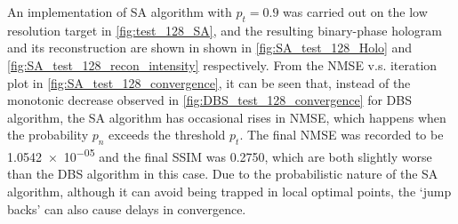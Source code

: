 An implementation of SA algorithm with $p_t = 0.9$ was carried out on the low resolution target in \cref{fig:test_128_SA}, and the resulting binary-phase hologram and its reconstruction are shown in shown in \cref{fig:SA_test_128_Holo} and \cref{fig:SA_test_128_recon_intensity} respectively. From the NMSE v.s. iteration plot in \cref{fig:SA_test_128_convergence}, it can be seen that, instead of the monotonic decrease observed in \cref{fig:DBS_test_128_convergence} for DBS algorithm, the SA algorithm has occasional rises in NMSE, which happens when the probability $p_n$ exceeds the threshold $p_t$. The final NMSE was recorded to be \num{1.0542e-05} and the final SSIM was 0.2750, which are both slightly worse than the DBS algorithm in this case. Due to the probabilistic nature of the SA algorithm, although it can avoid being trapped in local optimal points, the `jump backs' can also cause delays in convergence.

